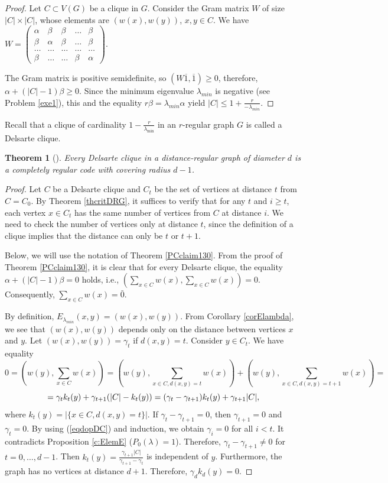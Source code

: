 \documentclass[11pt]{article}
\newtheorem{theorem}{Theorem}[section]
\theoremstyle{definition}
\begin{document}
{{\begin{proof}
Let $C\subset V(G)$ be a clique in  $G$. Consider the Gram matrix
$W$ of size $|C|\times |C|$, whose elements are
$(w(x),w(y))$, $x,y\in C$. We have \\
$W=\begin{pmatrix}
\alpha & \beta & \beta & \dots & \beta\\
\beta & \alpha & \beta& \dots & \beta\\
\dots & \dots & \dots & \dots & \dots \\
\beta & \dots & \dots & \beta & \alpha
\end{pmatrix}$.

The Gram matrix is positive semidefinite, so
$(W\overline{1},\overline{1})\geq 0$, therefore, $\alpha+
(|C|-1)\beta\geq 0$. Since the minimum eigenvalue
$\lambda_{min}$ is negative (see Problem \ref{exe1}), this and the equality $r\beta=\lambda_{min}\alpha$ yield $|C|\leq
1+\frac{r}{-\lambda_{min}}$.
\end{proof}

Recall that a clique of cardinality $1-\frac{r}{\lambda_{\min}}$ in an
$r$-regular graph $G$ is called a Delsarte clique.


\begin{theorem}[\cite{Godsil}]\label{PCclaim131}
Every Delsarte clique in a distance-regular graph of diameter $d$
is a completely regular code with covering radius $d-1$.
\end{theorem}
\begin{proof}
Let $C$ be a Delsarte clique and $C_t$ be the set of vertices at
distance $t$ from $C=C_0$. By Theorem \ref{thcritDRG}, it suffices to verify that for any $t$ and $i\geq t$, each vertex $x\in C_t$
has the same number of vertices from $C$ at distance $i$. We need to check the number of vertices only at distance $t$,
since the definition of a clique implies that the distance can only be $t$ or
$t+1$.

Below, we will use the notation  of Theorem
\ref{PCclaim130}. From the proof of Theorem \ref{PCclaim130}, it is clear
that for every Delsarte clique, the equality $\alpha+ (|C|-1)\beta=
0$ holds, i.e., $(\sum\limits_{x\in C} w(x), \sum\limits_{x\in C}
w(x))= 0$. Consequently, $\sum\limits_{x\in C} w(x)=\bar 0$.

By definition, $E_{\lambda_{min}}(x,y)=(w(x),w(y))$. From Corollary
\ref{corElambda}, we see that $(w(x),w(y))$ depends only on
the distance between vertices $x$ and $y$. Let $(w(x),w(y))=\gamma_t$
if $d(x,y)=t$. Consider $y\in C_t$. We have equality
$$0=(w(y),\sum\limits_{x\in C} w(x))= (w(y),\sum\limits_{x\in C,
d(x,y)=t} w(x))+ (w(y),\sum\limits_{x\in C, d(x,y)=t+1} w(x))=$$
$$\hfill = \gamma_tk_t(y)+ \gamma_{t+1}(|C|-k_t(y))=(\gamma_t-\gamma_{t+1})k_t(y)+ \gamma_{t+1}|C|,$$ where $k_t(y)=|\{x\in
C, d(x,y)=t\}|$. If $\gamma_t-\gamma_{t+1}=0$, then $\gamma_{t+1}=0$ and $\gamma_{t}=0$.
By using (\ref{eqdopDC}) and induction, we obtain  $\gamma_{i}=0$ for all $i<t$. It contradicts  Proposition \ref{c:ElemE} ($P_0(\lambda)=1$). Therefore, 
$\gamma_t-\gamma_{t+1}\neq 0$ for $t=0,\dots,d-1$. Then $k_t(y)=
\frac{\gamma_{t+1}|C|}{\gamma_{t+1}-\gamma_{t}}$ is independent of $y$.
Furthermore, the graph has no vertices at distance $d+1$. Therefore,
$\gamma_dk_d(y)=0$.
\end{proof}

}}
\end{document}
